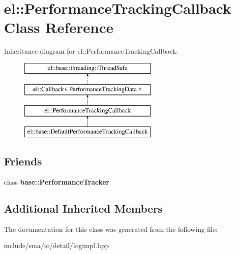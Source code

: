 \hypertarget{classel_1_1PerformanceTrackingCallback}{\section{el\-:\-:Performance\-Tracking\-Callback Class Reference}
\label{classel_1_1PerformanceTrackingCallback}
}
Inheritance diagram for el\-:\-:Performance\-Tracking\-Callback\-:\begin{figure}[H]
\begin{center}
\leavevmode
\includegraphics[height=4.000000cm]{classel_1_1PerformanceTrackingCallback}
\end{center}
\end{figure}
\subsection*{Friends}
\begin{DoxyCompactItemize}
\item 
\hypertarget{classel_1_1PerformanceTrackingCallback_a05f271f9cc2531409fe682c6ce0d9feb}{class {\bfseries base\-::\-Performance\-Tracker}}\label{classel_1_1PerformanceTrackingCallback_a05f271f9cc2531409fe682c6ce0d9feb}

\end{DoxyCompactItemize}
\subsection*{Additional Inherited Members}


The documentation for this class was generated from the following file\-:\begin{DoxyCompactItemize}
\item 
include/sma/io/detail/logimpl.\-hpp\end{DoxyCompactItemize}
